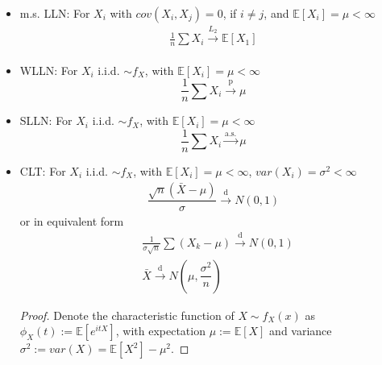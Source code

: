 \begin{itemize}[topsep=2pt,itemsep=0pt]
\item m.s. LLN: For $ X_i $ with $ cov(X_i,X_j)=0$, if $ i\neq j $, and $ \mathbb{E}\left[ X_i \right] =\mu <\infty $
\begin{align}
    \frac{1}{n}\sum X_i\xrightarrow[]{L_2} \mathbb{E}\left[ X_1 \right]
\end{align}


\item WLLN: For $ X_i $ i.i.d. $ \sim f_X $, with $ \mathbb{E}\left[ X_i \right]=\mu <\infty $
\begin{equation}\label{EqaWLLN}    \frac{1}{n}\sum X_i\xrightarrow[]{\mathrm{p}}\mu 
\end{equation}
\item SLLN: For $ X_i $ i.i.d. $ \sim f_X $, with $ \mathbb{E}\left[ X_i \right] =\mu <\infty $
\begin{equation}    \frac{1}{n}\sum X_i\xrightarrow[]{\text{a.s.}}  \mu 
\end{equation}
\item CLT: For $ X_i $ i.i.d. $ \sim f_X $, with $ \mathbb{E}\left[ X_i \right] =\mu <\infty $, $ var(X_i)=\sigma ^2<\infty $
\begin{align}
     \dfrac{\sqrt{n}\left(\bar{X}-\mu \right)}{\sigma }\xrightarrow[]{\mathrm{d}} N(0,1)
\end{align}
or in equivalent form
\begin{align}    
    &\frac{1}{\sigma\sqrt{n}}\sum(X_k-\mu)\xrightarrow[]{\mathrm{d}} N(0,1)\\
    &\bar{X}\xrightarrow[]{\mathrm{d}} N(\mu ,\dfrac{\sigma ^2}{n})
\end{align}

\begin{proof}
    Denote the characteristic function of $ X\sim f_X(x) $ as $ \phi _X(t):=\mathbb{E}\left[ e^{itX} \right] $, with expectation $ \mu :=\mathbb{E}\left[ X \right]  $ and variance $ \sigma^2:=var(X)=\mathbb{E}\left[ X^2\right] -\mu  ^2 $.
    

\end{proof}
\end{itemize}
